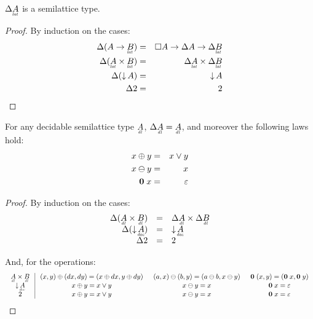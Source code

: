 \documentclass{article}
\begin{document}

\begin{lemma}
  $\GD \lat{A}$ is a semilattice type.

\end{lemma}
\begin{proof}
  By induction on the cases:
  \begin{eqnarray*}
    \GD(A \to \lat{B}) &=& \Disc{A} \to \GD A \to \GD \lat{B}\\
    \GD(\lat{A} \x \lat{B}) &=& \GD \lat{A} \x \GD \lat{B}\\
    \GD(\Down{A}) &=& \Down{A}\\
    \GD 2 &=& 2
  \end{eqnarray*}
\end{proof}

\begin{lemma}\label{lemma:dl-boring}
  For any decidable semilattice type $\eqlat{A}$, $\GD \eqlat{A} = \eqlat{A}$,
  and moreover the following laws hold:
  \begin{eqnarray*}
    x \oplus y &=& x \vee y\\
    x \ominus y &=& x\\
    \mathbf{0}\; x &=& \varepsilon
  \end{eqnarray*}
\end{lemma}
\begin{proof}
  By induction on the cases:
  \[\begin{array}{rcl}
    \GD(\eqlat{A} \x \eqlat{B}) &=& \GD \eqlat{A} \x \GD \eqlat{B}\\
    \GD(\Down{\eq{A}}) &=& \Down{\eq{A}}\\
    \GD \tbool &=& \tbool
  \end{array}\]

  And, for the operations:
  \[\arraycolsep=0.75em
  \begin{array}{c|ccc}
    \eqlat{A} \x \eqlat{B}
    & (x,y) \oplus (dx,dy) = (x \oplus dx, y \oplus dy)
    & (a,x) \ominus (b,y) = (a \ominus b, x \ominus y)
    & \zero\; (x,y) = (\zero\; x, \zero\; y)\\
    \Down{\eq{A}}
    & x \oplus y = x \vee y
    & x \ominus y = x
    & \zero\;x = \unit\\
    \tbool
    & x \oplus y = x \vee y
    & x \ominus y = x
    & \zero\;x = \unit\\
  \end{array}
  \]
\end{proof}
\end{document}

